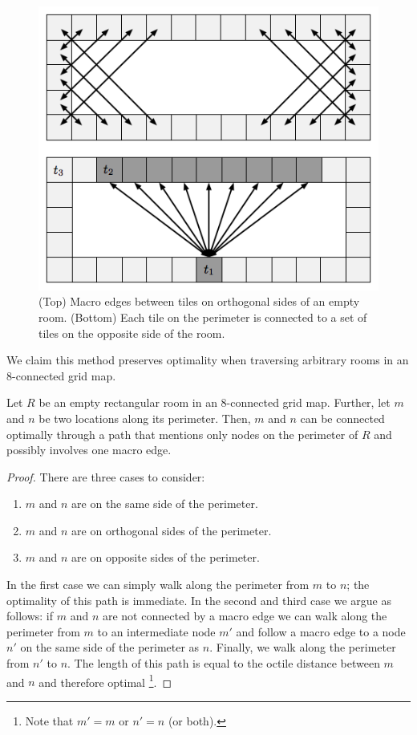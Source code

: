 \begin{figure}[tb]
       \begin{center}
                       \includegraphics[scale=0.5, trim = 10mm 10mm 10mm 0mm]{diagrams/macroedges.png}
       \end{center}
	\vspace{-3pt}
       \caption{(Top) Macro edges between tiles on orthogonal sides of an empty room. 
(Bottom) Each tile on the perimeter is connected to a set of tiles on the opposite side of the room.}
       \label{fig-macroedges}
\end{figure}
We claim this method preserves optimality when traversing arbitrary rooms in an 8-connected grid map.
\begin{lemma}
\label{lemma-rooms}
Let $R$ be an empty rectangular room in an 8-connected grid map.
Further, let $m$ and $n$ be two locations along its perimeter.
Then, $m$ and $n$ can be connected optimally through a path that mentions only nodes on the perimeter of $R$ and
possibly involves one macro edge.
\end{lemma}

\begin{proof}
There are three cases to consider:
\begin{enumerate}
\item{$m$ and $n$ are on the same side of the perimeter.}
\item{$m$ and $n$ are on orthogonal sides of the perimeter.}
\item{\label{lemma-rooms-step3} $m$ and $n$ are on opposite sides of the perimeter.}
\end{enumerate}
In the first case we can simply walk along the perimeter from $m$ to $n$; the optimality of this path is immediate. 
In the second and third case we argue as follows: if $m$ and $n$ are not connected by a macro edge
we can walk along the perimeter from $m$ to an intermediate node $m'$ and follow a macro edge to a node $n'$ on the 
same side of the perimeter as $n$. Finally, we walk along the perimeter from $n'$ to $n$.
The length of this path is equal to the octile distance between $m$ and $n$ and therefore optimal
\footnote{Note that $m' = m$ or $n' = n$ (or both).}.
\end{proof}

